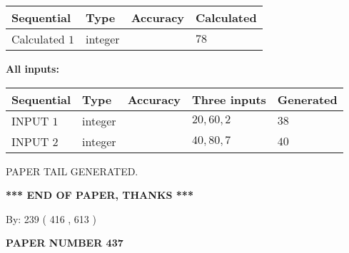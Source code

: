 \documentclass[12pt]{article}
\begin{document}
  
\noindent\begin{tabular}{|l|l|l|l|}
\hline
 Sequential & Type & Accuracy & Calculated \\ 
\hline
 
 
  Calculated $  1 $ & integer &  & 
  $ 78 $ 
 \\  \hline  
 \end{tabular}
   
   
   
   
\noindent\vspace{0.1in}\hspace{-0.08in} {\textbf{\Large{All inputs: }}}
   
   
  
  
\noindent\begin{tabular}{|l|l|l|l|l|}
\hline
 Sequential & Type & Accuracy & Three inputs & Generated \\ 
\hline
 
 
  INPUT $  1 $ & integer &  & $
 20
 , 
 60
 , 
 2
 $ & $ 38 $ 
 \\  \hline  
 
 
  INPUT $  2 $ & integer &  & $
 40
 , 
 80
 , 
 7
 $ & $ 40 $ 
 \\  \hline  
 \end{tabular}
   
   
   
   
   
   
 \vspace{0.2in}
 
   
   
\vspace{2.0in} PAPER TAIL GENERATED.
   
   
   
   
\vspace{1.0in} 
{\textbf{\large{ *** END OF PAPER, THANKS *** }}} 
   
   
\hspace{1.0in} By: 
 239 ( 416 ,  613 )
   
   
   
   
\newpage 
\setcounter{page}{ 
   437001 } 
   
   
   
   
 {\textbf{ \Large{ PAPER NUMBER  437  }}}
   
   
\vspace{0.2in}
   
   
   
\end{document}
